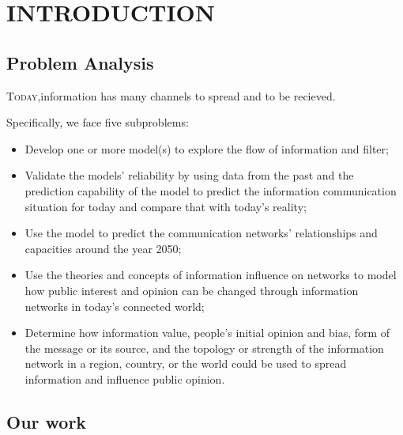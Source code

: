 \section  {INTRODUCTION}

\subsection{Problem Analysis}
\par
\lettrine[lines=2]{T}{oday},information has many channels to spread and to be recieved. 

\par Specifically, we face five subproblems:
\begin{itemize}
\item Develop one or more model(s) to explore the flow of information and filter;
\item Validate the models' reliability by using data from the past and the prediction capability of the model to predict the information communication situation for today and compare that with today's reality;
\item Use the model to predict the communication networks' relationships and capacities around the year 2050;

\item Use the theories and concepts of information influence on networks to model how public interest and opinion can be changed through information networks in today's connected world;

\item Determine how information value, people's initial opinion and bias, form of the message or its source, and the topology or strength of the information network in a region, country, or the world could be used to spread information and influence public opinion. 
\end{itemize}



 \subsection{Our work}


